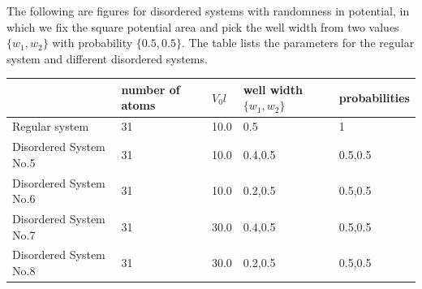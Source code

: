 The following are figures for disordered systems with randomness in potential, in which we fix the square potential area and pick the well width from two values$\{w_1,w_2\}$ with probability $\{0.5,0.5\}$. 
The table lists the parameters for the regular system and different disordered systems. 

\newpage
\begin{table}[]
\centering
\begin{tabular}{|l|l|l|l|l|}
\hline
	 & number of atoms  &$V_0l$& well width $\{w_1,w_2\}$ & probabilities   \\ \hline
Regular system&31& 10.0  & {0.5}  & {1} \\ \hline
Disordered System No.5 &31 &10.0   & {0.4,0.5}  & {0.5,0.5}    \\ \hline
Disordered System No.6 &31 &10.0   & {0.2,0.5}  & {0.5,0.5}    \\ \hline
Disordered System No.7 &31 &30.0   & {0.4,0.5}  & {0.5,0.5}    \\ \hline
Disordered System No.8 &31 &30.0   & {0.2,0.5}  & {0.5,0.5}    \\ \hline
\end{tabular}
\centering
\end{table}


